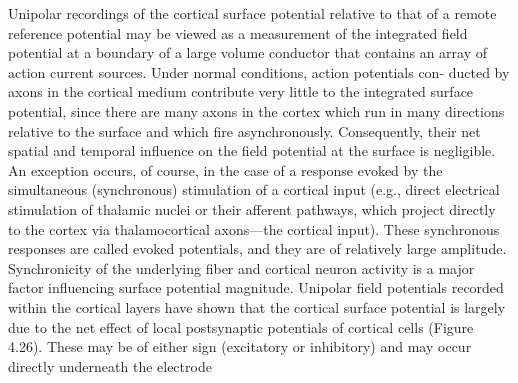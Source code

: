 Unipolar recordings of the cortical surface potential relative to that of a
remote reference potential may be viewed as a measurement of the integrated
field potential at a boundary of a large volume conductor that contains an array
of action current sources. Under normal conditions, action potentials con-
ducted by axons in the cortical medium contribute very little to the integrated
surface potential, since there are many axons in the cortex which run in many
directions relative to the surface and which fire asynchronously. Consequently,
their net spatial and temporal influence on the field potential at the surface is
negligible. An exception occurs, of course, in the case of a response evoked by
the simultaneous (synchronous) stimulation of a cortical input (e.g., direct
electrical stimulation of thalamic nuclei or their afferent pathways, which
project directly to the cortex via thalamocortical axons—the cortical input).
These synchronous responses are called evoked potentials, and they are of
relatively large amplitude. Synchronicity of the underlying fiber and cortical
neuron activity is a major factor influencing surface potential magnitude.
Unipolar field potentials recorded within the cortical layers have shown
that the cortical surface potential is largely due to the net effect of local
postsynaptic potentials of cortical cells (Figure 4.26). These may be of either
sign (excitatory or inhibitory) and may occur directly underneath the electrode

